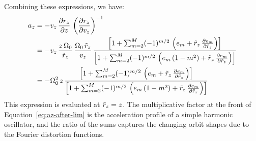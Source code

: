 Combining these expressions, we have:
\begin{align}
    a_z &=
        -v_z \, \frac{\partial r_z}{\partial z} \,
        \left( \frac{\partial r_z}{\partial v_z} \right)^{-1}\\
    &= -v_z \, \frac{z\,\Omega_0}{\tilde{r}_z} \, \frac{\Omega_0 \, \tilde{r}_z}{v_z} \,
        \frac{\left[
            1 + \sum_{m=2}^{M} (-1)^{m/2} \,
                \left(e_m + \tilde{r}_z \, \frac{\partial e_m}{\partial \tilde{r}_z}\right)
        \right]}{\left[
            1 + \sum_{m=2}^{M} (-1)^{m/2} \,
                \left(e_m\,(1 - m^2) + \tilde{r}_z \, \frac{\partial e_m}{\partial \tilde{r}_z}\right)
        \right]} \\
    &= -\Omega_0^2 \, z \,
        \frac{\left[
            1 + \sum_{m=2}^{M} (-1)^{m/2} \,
                \left(e_m + \tilde{r}_z \, \frac{\partial e_m}{\partial \tilde{r}_z}\right)
        \right]}{\left[
            1 + \sum_{m=2}^{M} (-1)^{m/2} \,
                \left(e_m\,(1 - m^2) + \tilde{r}_z \, \frac{\partial e_m}{\partial \tilde{r}_z}\right)
        \right]} \label{eq:az-after-lim}
\end{align}
This expression is evaluated at $\tilde{r}_z = z$.
The multiplicative factor at the front of Equation~\ref{eq:az-after-lim} is the
acceleration profile of a simple harmonic oscillator, and the ratio of the sums captures
the changing orbit shapes due to the Fourier distortion functions.



